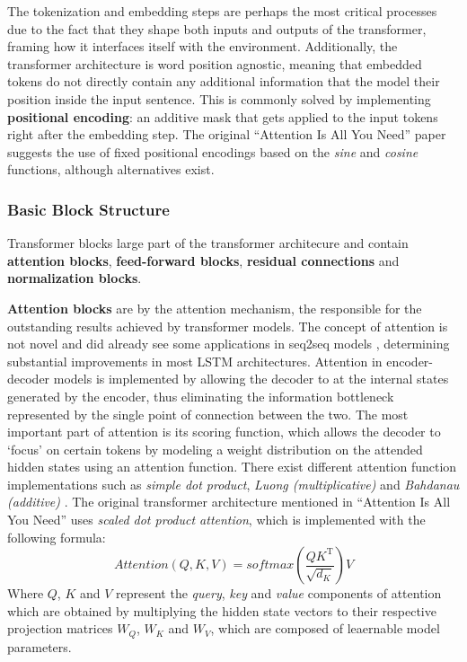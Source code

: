 The tokenization and embedding steps are perhaps the most critical processes due to the fact that they shape both inputs and outputs of the transformer, framing how it interfaces itself with the environment.
Additionally, the transformer architecture is word position agnostic, meaning that embedded tokens do not directly contain any additional information that  the model their position inside the input sentence.
This is commonly solved by implementing \textbf{positional encoding}: an additive mask that gets applied to the input tokens right after the embedding step.
The original ``Attention Is All You Need'' \cite{vaswani2017} paper suggests the use of fixed positional encodings based on the \textit{sine} and \textit{cosine} functions, although alternatives exist.

\subsubsection*{Basic Block Structure}

Transformer blocks  large part of the transformer architecure and contain \textbf{attention blocks}, \textbf{feed-forward blocks}, \textbf{residual connections} and \textbf{normalization blocks}.

\textbf{Attention blocks} are  by the attention mechanism, the  responsible for the outstanding results achieved by transformer models.
The concept of attention is not novel and did already see some applications in seq2seq models , determining substantial improvements in most LSTM architectures.
Attention in encoder-decoder models is implemented by allowing the decoder to  at the internal states generated by the encoder, thus eliminating the information bottleneck represented by the single point of connection between the two.
The most important part of attention is its scoring function, which allows the decoder to `focus' on certain tokens by modeling a weight distribution on the attended hidden states using an attention function.
There exist different attention function implementations such as \textit{simple dot product}, \textit{Luong (multiplicative)}  and \textit{Bahdanau (additive)} .
The original transformer architecture mentioned in ``Attention Is All You Need'' \cite{vaswani2017} uses \textit{scaled dot product attention}, which is implemented with the following formula:
\begin{equation}
    Attention(Q,K,V) = softmax\left(\frac{QK^\mathrm{T}}{\sqrt{d_K}}\right)V
\end{equation}
Where $Q$, $K$ and $V$ represent the \textit{query}, \textit{key} and \textit{value} components of attention which are obtained by multiplying the hidden state vectors to their respective projection matrices $W_Q$, $W_K$ and $W_V$, which are composed of leaernable model parameters.

